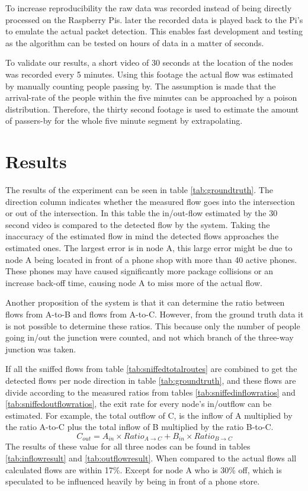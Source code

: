 \documentclass{IEEEtran}
\begin{document}
To increase reproducibility the raw data was recorded instead of being directly processed on the Raspberry Pis. later the recorded data is played back to the Pi's to emulate the actual packet detection. This enables fast development and testing as the algorithm can be tested on hours of data in a matter of seconds.

To validate our results, a short video of 30 seconds at the location of the nodes was recorded every 5 minutes. Using this footage the actual flow was estimated by manually counting people passing by. The assumption is made that the arrival-rate of the people within the five minutes can be approached by a poison distribution. Therefore, the thirty second footage is used to estimate the amount of passers-by for the whole five minute segment by extrapolating.

\section{Results}
The results of the experiment can be seen in table \ref{tab:groundtruth}. The direction column indicates whether the measured flow goes into the intersection or out of the intersection. In this table the in/out-flow estimated by the 30 second video is compared to the detected flow by the system. Taking the inaccuracy of the estimated flow in mind the detected flows approaches the estimated ones. The largest error is in node A, this large error might be due to node A being located in front of a phone shop with more than 40 active phones. These phones may have caused significantly more package collisions or an increase back-off time, causing node A to miss more of the actual flow.

Another proposition of the system is that it can determine the ratio between flows from A-to-B and flows from A-to-C. However, from the ground truth data it is not possible to determine these ratios. This because only the number of people going in/out the junction were counted, and not which branch of the three-way junction was taken.

If all the sniffed flows from table \ref{tab:sniffedtotalroutes} are combined to get the detected flows per node direction in table \ref{tab:groundtruth}, and these flows are divide according to the measured ratios from tables \ref{tab:sniffedinflowratios} and \ref{tab:sniffedoutflowratios}, the exit rate for every node's in/outflow can be estimated.
For example, the total outflow of C, is the inflow of A multiplied by the ratio A-to-C plus the total inflow of B multiplied by the ratio B-to-C.
$$ C_{out} = A_{in} \times Ratio_{A\rightarrow C} +B_{in} \times Ratio_{B\rightarrow C} $$
The results of these value for all three nodes can be found in tables  \ref{tab:inflowresult} and \ref{tab:outflowresult}.
When compared to the actual flows all calculated flows are within 17\%. Except for node A who is 30\% off, which is speculated to be influenced heavily by being in front of a phone store. 
\end{document}

